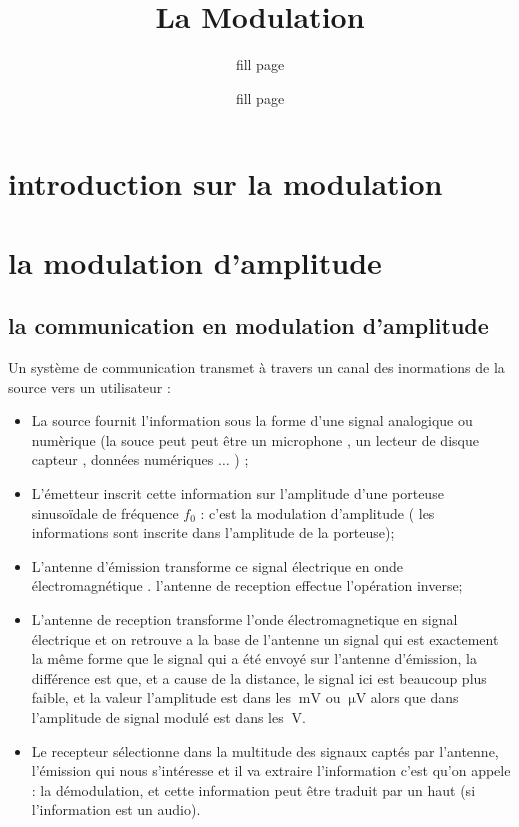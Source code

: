 \documentclass[12pt,a4paper,hidelinks,oneside]{book}
\title{La Modulation}
\author{fill page \\
	\and 
	fill page\\ 
}
\date{}
\begin{document}
\maketitle
\tableofcontents
\chapter{introduction sur la modulation}
\chapter{la modulation d'amplitude}
\section{la communication en modulation d'amplitude}
Un système de communication transmet à travers un canal des inormations de la source vers un utilisateur :
\begin{itemize}
	\item La source fournit l'information sous la forme d'une signal analogique ou numèrique (la souce peut peut être un microphone , un lecteur de disque
	capteur , données numériques $\ldots$ ) ;
	\item L'émetteur inscrit cette information sur l'amplitude d'une porteuse sinusoïdale de fréquence $f_{0}$ : c'est la modulation d'amplitude ( les informations sont inscrite dans l'amplitude de la porteuse);
	\item L'antenne d'émission transforme ce signal électrique en onde électromagnétique . l'antenne de reception effectue l'opération inverse;
	\item L'antenne de reception transforme l'onde électromagnetique en signal électrique et on retrouve a la base de l'antenne un signal qui est exactement 
	la même forme que le signal qui a été envoyé sur l'antenne d'émission, la différence est que, et a cause de la distance, le signal ici est beaucoup plus faible, et la valeur l'amplitude est dans les $\SI{}{\milli\volt}$ ou $\SI{}{\micro\volt}$ alors que dans l'amplitude de signal modulé est dans les $\SI{}{\volt}$.
	\item Le recepteur sélectionne dans la multitude des signaux captés par l'antenne, l'émission qui nous s'intéresse et il va extraire l'information c'est qu'on appele : la démodulation, et cette information peut être traduit par un haut (si l'information est un audio). 
\end{itemize}
\end{document}
